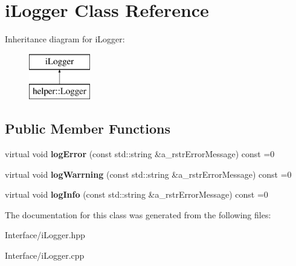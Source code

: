 \hypertarget{classi_logger}{}\section{i\+Logger Class Reference}
\label{classi_logger}
Inheritance diagram for i\+Logger\+:\begin{figure}[H]
\begin{center}
\leavevmode
\includegraphics[height=2.000000cm]{classi_logger}
\end{center}
\end{figure}
\subsection*{Public Member Functions}
\begin{DoxyCompactItemize}
\item 
\mbox{\label{classi_logger_af0b2b375f6b16f73ff5097c6f599889e}} 
virtual void {\bfseries log\+Error} (const std\+::string \&a\+\_\+rstr\+Error\+Message) const =0
\item 
\mbox{\label{classi_logger_ad61679e5c614d84941b86f3a3c35e68a}} 
virtual void {\bfseries log\+Warrning} (const std\+::string \&a\+\_\+rstr\+Error\+Message) const =0
\item 
\mbox{\label{classi_logger_af93c7daa84c8c7089558bf9bb56639df}} 
virtual void {\bfseries log\+Info} (const std\+::string \&a\+\_\+rstr\+Error\+Message) const =0
\end{DoxyCompactItemize}


The documentation for this class was generated from the following files\+:\begin{DoxyCompactItemize}
\item 
Interface/i\+Logger.\+hpp\item 
Interface/i\+Logger.\+cpp\end{DoxyCompactItemize}
